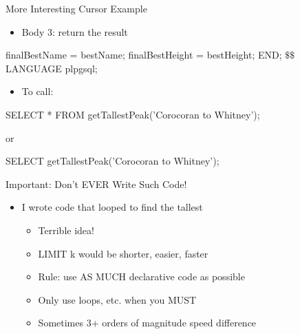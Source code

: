 \documentclass[aspectratio=169]{beamer}
\newenvironment{noindentitemize}
{ \begin{itemize}
 \setlength{\itemsep}{1.5ex}
  \setlength{\parsep}{0pt}   
  \setlength{\parskip}{0pt}
 \addtolength{\leftskip}{-2em}
 }
{ \end{itemize} }
\begin{document}

\begin{frame}[fragile]{More Interesting Cursor Example}

\begin{noindentitemize}
\item Body 3: return the result
\end{noindentitemize}

\begin{SQL}
finalBestName = bestName;
finalBestHeight = bestHeight;
END;
$\textbf{\$\$}$
LANGUAGE plpgsql;
\end{SQL}

\begin{noindentitemize}
\item To call:
\end{noindentitemize}

\begin{SQL}
SELECT * FROM getTallestPeak('Corocoran to Whitney');
\end{SQL}

or 

\begin{SQL}
SELECT getTallestPeak('Corocoran to Whitney');
\end{SQL}
\end{frame}



\begin{frame}{Important: Don't EVER Write Such Code!}

\begin{itemize}
\item I wrote code that looped to find the tallest
	\begin{itemize}
	\item Terrible idea!
	\item LIMIT k would be shorter, easier, faster
	\item Rule: use AS MUCH declarative code as possible
	\item Only use loops, etc. when you MUST
	\item Sometimes 3+ orders of magnitude speed difference
	\end{itemize}	
\end{itemize}
\end{frame}


\end{document}
